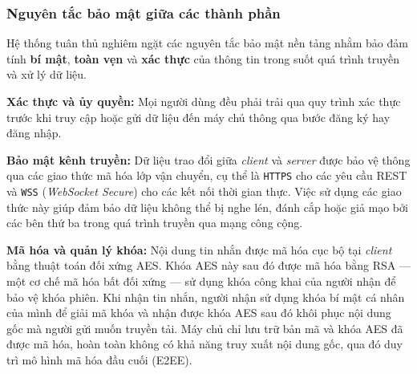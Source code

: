 \subsubsection{Nguyên tắc bảo mật giữa các thành phần}
\indent Hệ thống tuân thủ nghiêm ngặt các nguyên tắc bảo mật nền tảng nhằm bảo đảm tính \textbf{bí mật}, \textbf{toàn vẹn} và \textbf{xác thực} của thông tin trong suốt quá trình truyền và xử lý dữ liệu.

\indent \textbf{Xác thực và ủy quyền:} Mọi người dùng đều phải trải qua quy trình xác thực trước khi truy cập hoặc gửi dữ liệu đến máy chủ thông qua bước đăng ký hay đăng nhập. 

\indent \textbf{Bảo mật kênh truyền:} Dữ liệu trao đổi giữa \textit{client} và \textit{server} được bảo vệ thông qua các giao thức mã hóa lớp vận chuyển, cụ thể là \texttt{HTTPS} cho các yêu cầu REST và \texttt{WSS} (\textit{WebSocket Secure}) cho các kết nối thời gian thực.  
Việc sử dụng các giao thức này giúp đảm bảo dữ liệu không thể bị nghe lén, đánh cắp hoặc giả mạo bởi các bên thứ ba trong quá trình truyền qua mạng công cộng.

\indent \textbf{Mã hóa và quản lý khóa:} Nội dung tin nhắn được mã hóa cục bộ tại \textit{client} bằng thuật toán đối xứng AES.  
Khóa AES này sau đó được mã hóa bằng RSA — một cơ chế mã hóa bất đối xứng — sử dụng khóa công khai của người nhận để bảo vệ khóa phiên.  
Khi nhận tin nhắn, người nhận sử dụng khóa bí mật cá nhân của mình để giải mã khóa và nhận được khóa AES sau đó khôi phục nội dung gốc mà người gửi muốn truyền tải.  
Máy chủ chỉ lưu trữ bản mã và khóa AES đã được mã hóa, hoàn toàn không có khả năng truy xuất nội dung gốc, qua đó duy trì mô hình mã hóa đầu cuối (E2EE).
